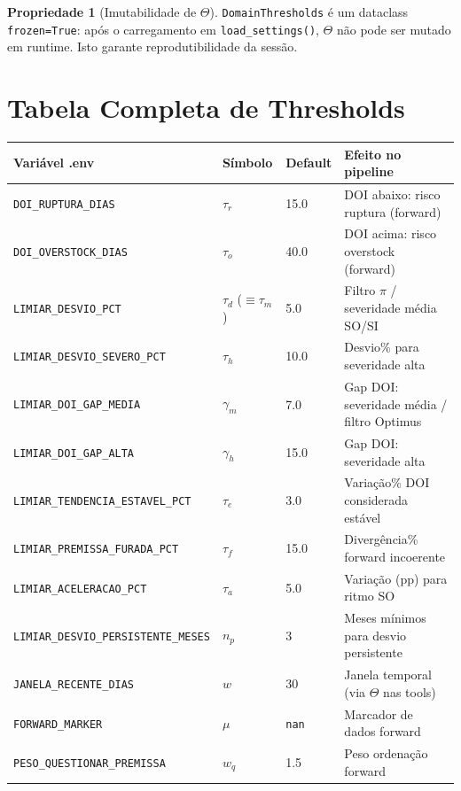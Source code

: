 \documentclass[a4paper, 12pt]{report}
\theoremstyle{definition}
\newtheorem{propriedade}{Propriedade}[chapter]
\theoremstyle{remark}
\begin{document}
\begin{propriedade}[Imutabilidade de $\Theta$]
  \texttt{DomainThresholds} \'e um dataclass \texttt{frozen=True}:
  ap\'os o carregamento em \texttt{load\_settings()}, $\Theta$ n\~ao pode
  ser mutado em runtime. Isto garante reprodutibilidade da sess\~ao.
\end{propriedade}


\section{Tabela Completa de Thresholds}

\begin{center}
\begin{tabular}{llp{1.8cm}p{4.2cm}}
  \toprule
  \textbf{Vari\'avel .env} & \textbf{S\'imbolo} & \textbf{Default} & \textbf{Efeito no pipeline} \\
  \midrule
  \texttt{DOI\_RUPTURA\_DIAS} & $\tau_r$ & 15.0 & DOI abaixo: risco ruptura (forward) \\
  \texttt{DOI\_OVERSTOCK\_DIAS} & $\tau_o$ & 40.0 & DOI acima: risco overstock (forward) \\
  \texttt{LIMIAR\_DESVIO\_PCT} & $\tau_d$ ($\equiv\tau_m$) & 5.0 & Filtro $\pi$ / severidade m\'edia SO/SI \\
  \texttt{LIMIAR\_DESVIO\_SEVERO\_PCT} & $\tau_h$ & 10.0 & Desvio\% para severidade alta \\
  \texttt{LIMIAR\_DOI\_GAP\_MEDIA} & $\gamma_m$ & 7.0 & Gap DOI: severidade m\'edia / filtro Optimus \\
  \texttt{LIMIAR\_DOI\_GAP\_ALTA} & $\gamma_h$ & 15.0 & Gap DOI: severidade alta \\
  \texttt{LIMIAR\_TENDENCIA\_ESTAVEL\_PCT} & $\tau_e$ & 3.0 & Varia\c{c}\~ao\% DOI considerada est\'avel \\
  \texttt{LIMIAR\_PREMISSA\_FURADA\_PCT} & $\tau_f$ & 15.0 & Diverg\^encia\% forward incoerente \\
  \texttt{LIMIAR\_ACELERACAO\_PCT} & $\tau_a$ & 5.0 & Varia\c{c}\~ao (pp) para ritmo SO \\
  \texttt{LIMIAR\_DESVIO\_PERSISTENTE\_MESES} & $n_p$ & 3 & Meses m\'inimos para desvio persistente \\
  \texttt{JANELA\_RECENTE\_DIAS} & $w$ & 30 & Janela temporal (via $\Theta$ nas tools) \\
  \texttt{FORWARD\_MARKER} & $\mu$ & \texttt{nan} & Marcador de dados forward \\
  \texttt{PESO\_QUESTIONAR\_PREMISSA} & $w_q$ & 1.5 & Peso ordena\c{c}\~ao forward \\

\end{tabular}
\end{center}
\end{document}
